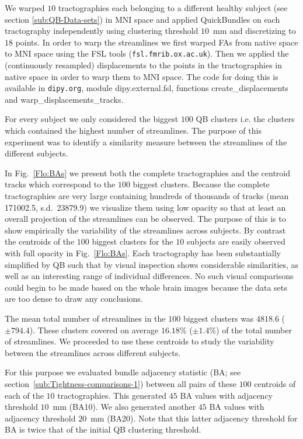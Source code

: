 \documentclass{bioinfo}
\begin{document}
We warped $10$ tractographies each belonging to a different healthy
subject (see section \ref{sub:QB-Data-sets}) in MNI space and applied
QuickBundles on each tractography independently using clustering
threshold $10$~mm and discretizing to $18$ points.  In order to warp the
streamlines we first warped FAs from native space to MNI space using the
FSL tools (\texttt{fsl.fmrib.ox.ac.uk}). Then we applied the (continuously
resampled) displacements to the points in the tractographies in native
space in order to warp them to MNI space. The code for doing this is
available in \texttt{dipy.org}, module dipy.external.fsl, functions
create\_displacements and warp\_displacements\_tracks.

For every subject we
only considered the biggest $100$ QB clusters i.e. the clusters which
contained the highest number of streamlines. The purpose of this
experiment was to identify a similarity measure between the
streamlines of the different subjects.

In Fig.~\ref{Flo:BAs} we present both the complete tractographies and
the centroid tracks which correspond to the $100$ biggest
clusters. Because the complete tractographies are very large containing
hundreds of thousands of tracks (mean \num{171002.5},
s.d.~\num{23879.9}) we visualize them using low opacity so that at least
an overall projection of the streamlines can be observed. The purpose of
this is to show empirically the variability of the streamlines across
subjects. By contrast the centroids of the $100$ biggest clusters for
the $10$ subjects are easily observed with full opacity in
Fig.~\ref{Flo:BAs}. Each tractography has been substantially simplified
by QB such that by visual inspection shows considerable similarities, as
well as an interesting range of individual differences. No such visual
comparisons could begin to be made based on the whole brain images
because the data sets are too dense to draw any conclusions.

The mean total number of streamlines in the $100$ biggest clusters was
$\num{4818.6}$ ($\pm \num{794.4}$). These clusters covered on average
$16.18\%$ ($\pm\num{1.4}\%$) of the total number of streamlines. We
proceeded to use these centroids to study the variability between the
streamlines across different subjects.

For this purpose we evaluated bundle adjacency statistic (BA; see
section~\ref{sub:Tightness-comparisons-1}) between all pairs of these
$100$ centroids of each of the $10$ tractographies. This generated $45$
BA values with adjacency threshold $10$~mm (BA10). We also generated
another $45$ BA values with adjacency threshold $20$~mm (BA20). Note
that this latter adjacency threshold for BA is twice that of the initial
QB clustering threshold.
\end{document}
